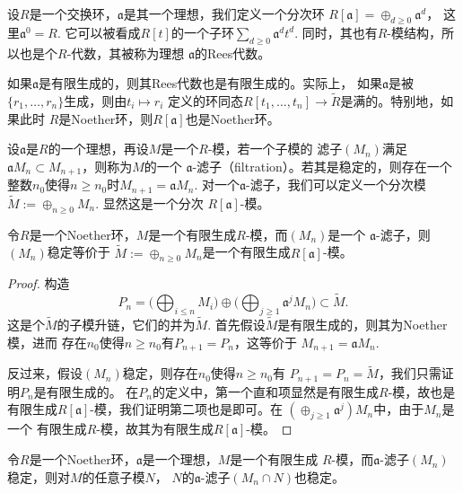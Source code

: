 \begin{para}[Rees代数]
设$R$是一个交换环，$\mathfrak a$是其一个理想，我们定义一个分次环
$R[\mathfrak a]=\oplus_{d\geq 0}\mathfrak a^d$，
这里$\mathfrak a^0=R$.
它可以被看成$R[t]$的一个子环$\sum_{d\geq 0}\mathfrak a^d t^d$.
同时，其也有$R$-模结构，所以也是个$R$-代数，其被称为理想
$\mathfrak a$的Rees代数。

如果$\mathfrak a$是有限生成的，则其Rees代数也是有限生成的。实际上，
如果$\mathfrak a$是被$\{r_1,\dots,r_n\}$生成，则由$t_i\mapsto r_i$
定义的环同态$R[t_1,\dots,t_n]\to \tilde R$是满的。特别地，如果此时
$R$是Noether环，则$R[\mathfrak a]$也是Noether环。
\end{para}

\begin{para}[滤子]
设$\mathfrak a$是$R$的一个理想，再设$M$是一个$R$-模，若一个子模的
滤子$(M_n)$满足$\mathfrak a M_n\subset M_{n+1}$，则称为$M$的一个
$\mathfrak a$-滤子（filtration）。若其是稳定的，则存在一个
整数$n_0$使得$n\geq n_0$时$M_{n+1}=\mathfrak aM_n$.
对一个$\mathfrak a$-滤子，我们可以定义一个分次模
$\tilde M:=\oplus_{n\geq 0} M_n$. 显然这是一个分次
$R[\mathfrak a]$-模。
\end{para}

\begin{lem}
令$R$是一个Noether环，$M$是一个有限生成$R$-模，而$(M_n)$是一个
$\mathfrak a$-滤子，则$(M_n)$稳定等价于
$\tilde M:=\oplus_{n\geq 0} M_n$是一个有限生成$R[\mathfrak a]$-模。
\end{lem}

\begin{proof}
构造
\[
	P_n=\biggl(\bigoplus_{i\leq n}M_i\biggr)\oplus \biggl(
	\bigoplus_{j\geq 1}\mathfrak a^jM_n	
	\biggr)\subset \tilde M.
\]
这是个$\tilde M$的子模升链，它们的并为$\tilde M$. 
首先假设$\tilde M$是有限生成的，则其为Noether模，进而
存在$n_0$使得$n\geq n_0$有$P_{n+1}=P_n$，这等价于
$M_{n+1}=\mathfrak aM_n$.

反过来，假设$(M_n)$稳定，则存在$n_0$使得$n\geq n_0$有
$P_{n+1}=P_n=\tilde M$，我们只需证明$P_n$是有限生成的。
在$P_n$的定义中，第一个直和项显然是有限生成$R$-模，故也是
有限生成$R[\mathfrak a]$-模，我们证明第二项也是即可。在
$(\oplus_{j\geq 1}\mathfrak a^j)M_n$中，由于$M_n$是一个
有限生成$R$-模，故其为有限生成$R[\mathfrak a]$-模。
\end{proof}

\begin{pro}
令$R$是一个Noether环，$\mathfrak a$是一个理想，$M$是一个有限生成
$R$-模，而$\mathfrak a$-滤子$(M_n)$稳定，则对$M$的任意子模$N$，
$N$的$\mathfrak a$-滤子$(M_n\cap N)$也稳定。
\end{pro}

